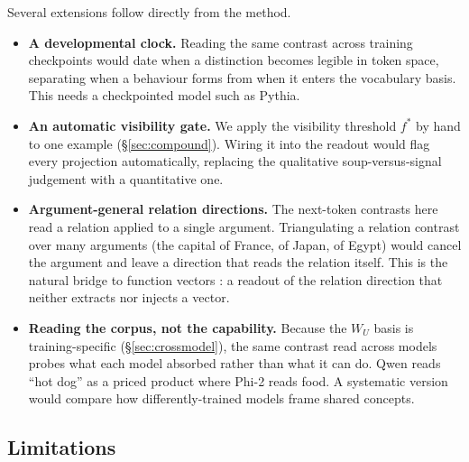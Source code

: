 \documentclass[11pt]{article}
\newcommand{\WU}{W_U}
\begin{document}
Several extensions follow directly from the method.
\begin{itemize}[leftmargin=*]
\item \textbf{A developmental clock.} Reading the same contrast across training
  checkpoints would date when a distinction becomes legible in token space,
  separating when a behaviour forms from when it enters the vocabulary basis.
  This needs a checkpointed model such as Pythia.
\item \textbf{An automatic visibility gate.} We apply the visibility threshold
  $f^{*}$ \citep{tuomi2026visibility} by hand to one example (\S\ref{sec:compound}).
  Wiring it into the readout would flag every projection automatically, replacing
  the qualitative soup-versus-signal judgement with a quantitative one.
\item \textbf{Argument-general relation directions.} The next-token contrasts
  here read a relation applied to a single argument. Triangulating a relation
  contrast over many arguments (the capital of France, of Japan, of Egypt)
  would cancel the argument and leave a direction that reads the relation
  itself. This is the natural bridge to function vectors
  \citep{todd2024}: a readout of the relation direction that neither extracts
  nor injects a vector.
\item \textbf{Reading the corpus, not the capability.} Because the $\WU$ basis
  is training-specific (\S\ref{sec:crossmodel}), the same contrast read across
  models probes what each model absorbed rather than what it can do. Qwen reads
  ``hot dog'' as a priced product where Phi-2 reads food. A systematic version
  would compare how differently-trained models frame shared concepts.
\end{itemize}

\subsection{Limitations}
\end{document}
